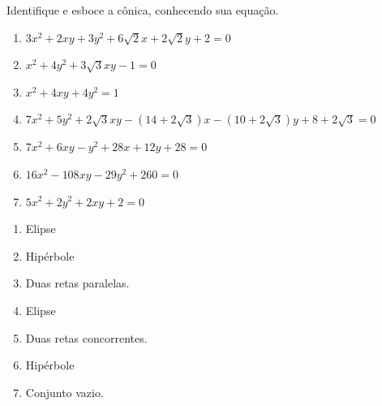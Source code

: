 \documentclass[12pt]{exam}
\begin{document}
\begin{exercicio}
    Identifique e esboce a cônica, conhecendo sua equação.
    \begin{enumerate}[label=({\alph*})]
        \item $3x^2 + 2xy + 3y^2 + 6\sqrt{2}x + 2\sqrt{2}y + 2 = 0$
        \item $x^2 + 4y^2 + 3\sqrt{3}xy - 1 = 0$
        \item $x^2 + 4xy + 4y^2 = 1$
        \item $7x^2 + 5y^2 + 2\sqrt{3}xy - (14 + 2\sqrt{3})x - (10 + 2\sqrt{3})y + 8 + 2\sqrt{3} = 0$
        \item $7x^2 + 6xy - y^2 + 28x + 12y + 28 = 0$
        \item $16x^2 - 108xy - 29y^2 + 260 = 0$
        \item $5x^2 + 2y^2 + 2xy + 2 = 0$
    \end{enumerate}
    \begin{solucao}
        \begin{enumerate}[label=({\alph*})]
            \item Elipse
            \item Hipérbole
            \item Duas retas paralelas.
            \item Elipse
            \item Duas retas concorrentes.
            \item Hipérbole
            \item Conjunto vazio.
        \end{enumerate}
    \end{solucao}
\end{exercicio}
\end{document}
